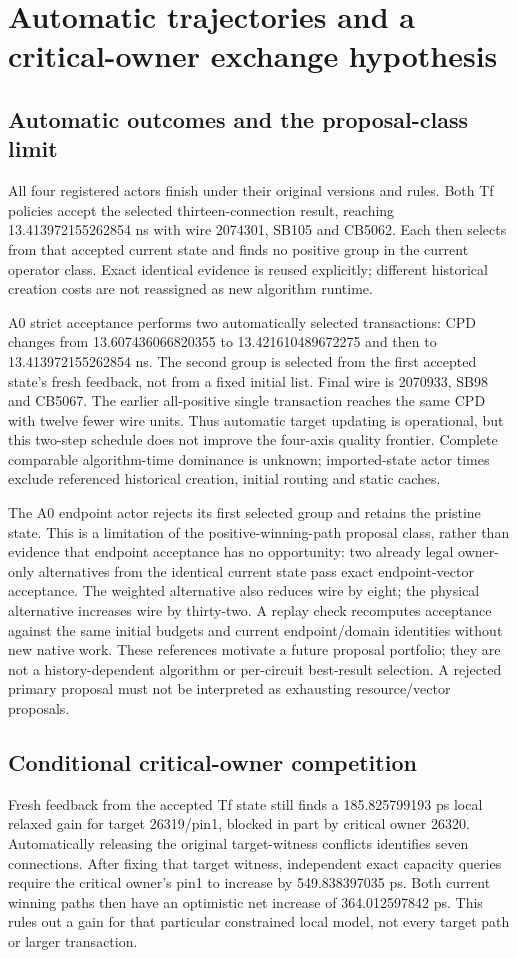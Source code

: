 
\section{Automatic trajectories and a critical-owner exchange hypothesis}
\subsection{Automatic outcomes and the proposal-class limit}
All four registered actors finish under their original versions and rules. Both Tf policies accept the selected thirteen-connection result, reaching 13.413972155262854 ns with wire 2074301, SB105 and CB5062. Each then selects from that accepted current state and finds no positive group in the current operator class. Exact identical evidence is reused explicitly; different historical creation costs are not reassigned as new algorithm runtime.

A0 strict acceptance performs two automatically selected transactions: CPD changes from 13.607436066820355 to 13.421610489672275 and then to 13.413972155262854 ns. The second group is selected from the first accepted state's fresh feedback, not from a fixed initial list. Final wire is 2070933, SB98 and CB5067. The earlier all-positive single transaction reaches the same CPD with twelve fewer wire units. Thus automatic target updating is operational, but this two-step schedule does not improve the four-axis quality frontier. Complete comparable algorithm-time dominance is unknown; imported-state actor times exclude referenced historical creation, initial routing and static caches.

The A0 endpoint actor rejects its first selected group and retains the pristine state. This is a limitation of the positive-winning-path proposal class, rather than evidence that endpoint acceptance has no opportunity: two already legal owner-only alternatives from the identical current state pass exact endpoint-vector acceptance. The weighted alternative also reduces wire by eight; the physical alternative increases wire by thirty-two. A replay check recomputes acceptance against the same initial budgets and current endpoint/domain identities without new native work. These references motivate a future proposal portfolio; they are not a history-dependent algorithm or per-circuit best-result selection. A rejected primary proposal must not be interpreted as exhausting resource/vector proposals.

\subsection{Conditional critical-owner competition}
Fresh feedback from the accepted Tf state still finds a 185.825799193 ps local relaxed gain for target 26319/pin1, blocked in part by critical owner 26320. Automatically releasing the original target-witness conflicts identifies seven connections. After fixing that target witness, independent exact capacity queries require the critical owner's pin1 to increase by 549.838397035 ps. Both current winning paths then have an optimistic net increase of 364.012597842 ps. This rules out a gain for that particular constrained local model, not every target path or larger transaction.

